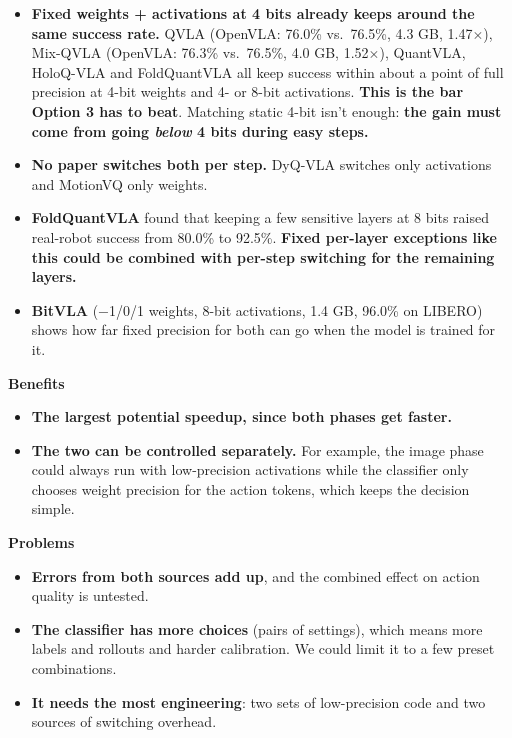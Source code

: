 \documentclass[11pt]{article}
\begin{document}
\begin{itemize}
\item \textbf{Fixed weights + activations at 4 bits already keeps around the same success rate.} QVLA (OpenVLA: 76.0\% vs.~76.5\%, 4.3 GB, 1.47$\times$), Mix-QVLA (OpenVLA: 76.3\% vs.~76.5\%, 4.0 GB, 1.52$\times$), QuantVLA, HoloQ-VLA and FoldQuantVLA all keep success within about a point of full precision at 4-bit weights and 4- or 8-bit activations. \textbf{This is the bar Option 3 has to beat}. Matching static 4-bit isn't enough: \textbf{the gain must come from going \emph{below} 4 bits during easy steps.}
\item \textbf{No paper switches both per step.} DyQ-VLA switches only activations and MotionVQ only weights.
\item \textbf{FoldQuantVLA} found that keeping a few sensitive layers at 8 bits raised real-robot success from 80.0\% to 92.5\%. \textbf{Fixed per-layer exceptions like this could be combined with per-step switching for the remaining layers.}
\item \textbf{BitVLA} ($-$1/0/1 weights, 8-bit activations, 1.4 GB, 96.0\% on LIBERO) shows how far fixed precision for both can go when the model is trained for it.
\end{itemize}

\textbf{Benefits}

\begin{itemize}
\item \textbf{The largest potential speedup, since both phases get faster.}
\item \textbf{The two can be controlled separately.} For example, the image phase could always run with low-precision activations while the classifier only chooses weight precision for the action tokens, which keeps the decision simple.
\end{itemize}

\textbf{Problems}

\begin{itemize}
\item \textbf{Errors from both sources add up}, and the combined effect on action quality is untested.
\item \textbf{The classifier has more choices} (pairs of settings), which means more labels and rollouts and harder calibration. We could limit it to a few preset combinations.
\item \textbf{It needs the most engineering}: two sets of low-precision code and two sources of switching overhead.
\end{itemize}
\end{document}

